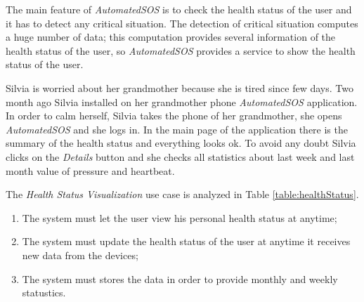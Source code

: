 The main feature of \textit{AutomatedSOS} is to check the health status of the user and it has to detect any critical situation.
The detection of critical situation computes a huge number of data; this computation provides several information of the health status of the user, so \textit{AutomatedSOS} provides a service to show the health status of the user.

Silvia is worried about her grandmother because she is tired since few days. Two month ago Silvia installed on her grandmother phone \textit{AutomatedSOS} application.
In order to calm herself, Silvia takes the phone of her grandmother, she opens \textit{AutomatedSOS} and she logs in.
In the main page of the application there is the summary of the health status and everything looks ok.
To avoid any doubt Silvia clicks on the \textit{Details} button and she checks all statistics about last week and last month value of pressure and heartbeat.

The \textit{Health Status Visualization} use case is analyzed in Table \ref{table:healthStatus}.

\begin{enumerate}
  \item The system must let the user view his personal health status at anytime;
  \item The system must update the health status of the user at anytime it receives new data from the devices;
  \item The system must stores the data in order to provide monthly and weekly statustics.
\end{enumerate}

